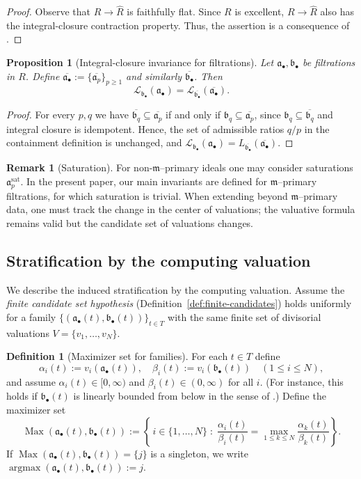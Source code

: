 \documentclass[12pt]{amsart}
\newcommand{\m}{\mathfrak m}
\newcommand{\ov}{\overline}
\renewcommand{\a}{\mathfrak{a}}
\renewcommand{\b}{\mathfrak{b}}
\newcommand{\Loj}{\mathcal{L}} %
\DeclareMathOperator{\argmax}{argmax}
\DeclareMathOperator{\Max}{Max}
\newcommand{\abul}{{\a_\bullet}}
\newcommand{\bbul}{{\b_\bullet}}
\theoremstyle{plain}
\newtheorem{proposition}[theorem]{Proposition}
\theoremstyle{definition}
\newtheorem{definition}[theorem]{Definition}
\newtheorem{remark}[theorem]{Remark}
\numberwithin{equation}{section}
\begin{document}
\begin{proof}
	Observe that $R \rightarrow \widehat{R}$ is faithfully flat. Since $R$ is excellent, $R \rightarrow \widehat{R}$ also has the integral-closure contraction property. Thus, the assertion is a consequence of .
\end{proof}

\begin{proposition}[Integral-closure invariance for filtrations]\label{prop:ic-filtration}
	Let $\abul,\bbul$ be filtrations in $R$.
	Define $\ov{\abul}:=\{\ov{\a_p}\}_{p\ge 1}$ and similarly $\ov{\bbul}$.
	Then
	\[
	\Loj_{\bbul}(\abul)=\Loj_{\ov{\bbul}}(\ov{\abul}).
	\]
\end{proposition}

\begin{proof}
	For every $p,q$ we have $\overline{\b_q}\subseteq \overline{\a_p}$ if and only if
	$\b_q\subseteq \overline{\a_p}$, since $\b_q\subseteq \overline{\b_q}$ and integral closure is idempotent.
	Hence, the set of admissible ratios $q/p$ in the containment definition is unchanged, and
	$\Loj_{\bbul}(\abul)=L_{\overline{\bbul}}(\overline{\abul})$.
\end{proof}

\begin{remark}[Saturation]
	For non-$\m$--primary ideals one may consider saturations $\a_p^{\mathrm{sat}}$.
	In the present paper, our main invariants are defined for $\m$--primary filtrations, for
	which saturation is trivial. When extending beyond $\m$--primary data, one must track the
	change in the center of valuations; the valuative formula remains valid but the candidate
	set of valuations changes.
\end{remark}

\subsection{Stratification by the computing valuation}
We describe the induced stratification by the computing valuation.
Assume the \emph{finite candidate set hypothesis} (Definition~\ref{def:finite-candidates}) holds uniformly for a family
$\{(\abul(t), \bbul(t))\}_{t\in T}$ with the same finite set of divisorial valuations
$V=\{v_1,\dots,v_N\}$.

\begin{definition}[Maximizer set for families]\label{def:maximizers}
	For each $t\in T$ define
	\[
	\alpha_i(t):=v_i(\a_\bullet(t)),\quad \beta_i(t):=v_i(\b_\bullet(t))\quad (1\le i\le N),
	\]
	and assume $\alpha_i(t)\in [0,\infty)$ and $\beta_i(t)\in (0,\infty)$ for all $i$.
	(For instance, this holds if $\bbul(t)$ is linearly bounded from below in the sense of .)
	Define the maximizer set
	\[
	\Max(\abul(t), \bbul(t))
	:=\left\{\, i\in\{1,\dots,N\} \;:\; \frac{\alpha_i(t)}{\beta_i(t)}
	=\max_{1\le k\le N}\frac{\alpha_k(t)}{\beta_k(t)} \right\}.
	\]
	If $\Max(\abul(t), \bbul(t))=\{j\}$ is a singleton, we write
	$\argmax(\abul(t), \bbul(t)):=j$.
\end{definition}
\end{document}

